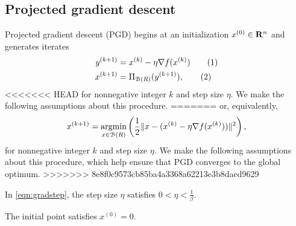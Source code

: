 \documentclass[11pt]{article}
\newcommand{\proj}{\ensuremath{\Pi_{\B(R)}}}
\newcommand\numberthis{\addtocounter{equation}{1}\tag{\theequation}}
\begin{document}
\subsection{Projected gradient descent}
Projected gradient descent (PGD) begins at an initialization $x^{(0)} \in \mathbf{R}^n$ and generates iterates
\begin{align*}
    y^{(k + 1)} &= x^{(k)} - \eta \nabla f(x^{(k)}) 
    \numberthis{}\label{eqn:gradstep}\\
    x^{(k + 1)} &= \proj (y^{(k + 1)}),
    \numberthis{}\label{eqn:projectionstep}
\end{align*}
<<<<<<< HEAD
for nonnegative integer $k$ and step size $\eta$. We make the following assumptions about this procedure. 
=======
or, equivalently,
\begin{equation}\label{eqn:argmin-projgrad}
  x^{(k+1)} =
  \mathop{\rm argmin}_{x \in \mathcal{B}(R)}
  \left(
  \frac{1}{2} \|x - (x^{(k)} - \eta \nabla f(x^{(k)}))\|^2
  \right),
\end{equation}
for nonnegative integer $k$ and step size $\eta$. We make the following assumptions 
about this procedure, which help ensure that PGD converges to the global optimum.
>>>>>>> 8e8f0c9573cb85ba4a3368a62213e3b8daed9629
\begin{assume}\label{assume:A}
In \eqref{eqn:gradstep}, the 
step size $\eta$ satisfies 
$0 < \eta < \frac{1}{\beta}$.
\end{assume}
\begin{assume}\label{assume:B}
The initial point satisfies $x^{(0)} = 0$.
\end{assume}
\end{document}
